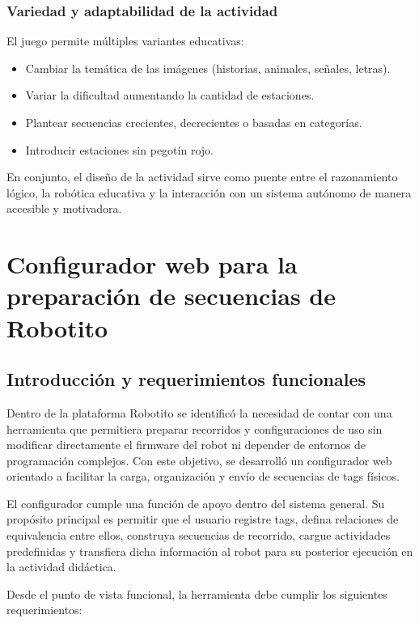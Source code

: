 \documentclass{prgrado}
\begin{document}
\subsection{Variedad y adaptabilidad de la actividad}

El juego permite múltiples variantes educativas:

\begin{itemize}
    \item Cambiar la temática de las imágenes (historias, animales, señales, letras).
    \item Variar la dificultad aumentando la cantidad de estaciones.
    \item Plantear secuencias crecientes, decrecientes o basadas en categorías.
    \item Introducir estaciones sin pegotín rojo.
\end{itemize}

En conjunto, el diseño de la actividad sirve como puente entre el razonamiento lógico, la robótica educativa y la interacción con un sistema autónomo de manera accesible y motivadora.

\chapter{Configurador web para la preparación de secuencias de Robotito}

\section{Introducción y requerimientos funcionales}

Dentro de la plataforma Robotito se identificó la necesidad de contar con una herramienta que permitiera preparar recorridos y configuraciones de uso sin modificar directamente el firmware del robot ni depender de entornos de programación complejos. Con este objetivo, se desarrolló un configurador web orientado a facilitar la carga, organización y envío de secuencias de tags físicos.

El configurador cumple una función de apoyo dentro del sistema general. Su propósito principal es permitir que el usuario registre tags, defina relaciones de equivalencia entre ellos, construya secuencias de recorrido, cargue actividades predefinidas y transfiera dicha información al robot para su posterior ejecución en la actividad didáctica.

Desde el punto de vista funcional, la herramienta debe cumplir los siguientes requerimientos:
\end{document}
